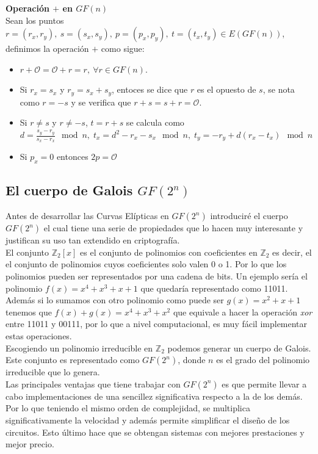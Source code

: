 \begin{aligned*}
\newpage
\textbf{Operación $+$ en $GF(n)$}\\
Sean los puntos $r=(r_x,r_y),\: s=(s_x,s_y),\: p=(p_x,p_y),\: t=(t_x,t_y)\in E(GF(n))$, definimos la operación $+$  como sigue:
\begin{itemize}
	\item $r+\mathcal{O}=\mathcal{O}+r=r,\: \forall r \in GF(n)$.
	\item Si $r_x=s_x$ y $r_y=s_x+s_y$, entoces se dice que $r$ es el opuesto de $s$, se nota como $r=-s$ y se verifica que $r+s=s+r=\mathcal{O}$.
	\item Si $r\neq s$ y $r\neq-s$, $t=r+s$ se calcula como $d=\frac{s_y-r_y}{s_x-r_x}\mod n,\; t_x=d^2-r_x-s_x \mod n,\; t_y=-r_y+d(r_x-t_x) \mod n$
	\item Si $p_x = 0$ entonces $2p = \mathcal{O}$
\end{itemize}

\subsection{El cuerpo de Galois $GF(2^n)$}

Antes de desarrollar las Curvas Elípticas en $GF(2^n)$ introduciré el cuerpo $GF(2^n)$ el cual tiene una serie de propiedades que lo hacen muy interesante y justifican su uso tan extendido en criptografía.\\
El conjunto $\mathbb{Z}_2[x]$ es el conjunto de polinomios con coeficientes en $\mathbb{Z}_2$ es decir, el el conjunto de polinomios cuyos coeficientes solo valen 0 o 1. Por lo que los polinomios pueden ser representados por una cadena de bits.
 Un ejemplo sería el polinomio $f(x)=x^4+x^3+x+1$ que quedaría representado como 11011. 
Además si lo sumamos con otro polinomio como puede ser $g(x)=x^2+x+1$ tenemos que $f(x)+g(x)=x^4+x^3+x^2$ que equivale a hacer la operación \emph{xor} entre 11011 y 00111, por lo que a nivel computacional, es muy fácil implementar estas operaciones.\\
Escogiendo un polinomio irreducible en $\mathbb{Z}_2$ podemos generar un cuerpo de Galois. Este conjunto es representado como $GF(2^n)$, donde $n$ es el grado del polinomio irreducible que lo genera.\\
Las principales ventajas que tiene trabajar con $GF(2^n)$ es que permite llevar a cabo implementaciones de una sencillez significativa respecto a la de los demás. Por lo que teniendo el mismo orden de complejidad, se multiplica significativamente la velocidad y además permite simplificar el diseño de los circuitos. Esto último hace que se obtengan sistemas con mejores prestaciones y mejor precio.


\end{aligned*}
